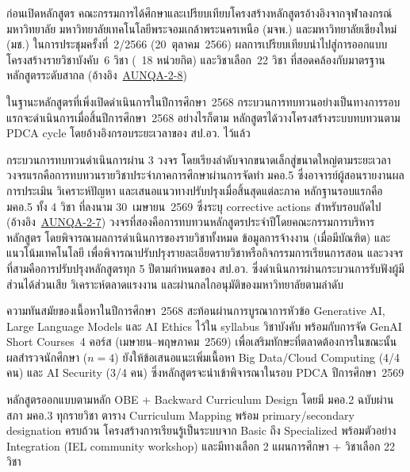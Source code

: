 

ก่อนเปิดหลักสูตร คณะกรรมการได้ศึกษาและเปรียบเทียบโครงสร้างหลักสูตรอ้างอิงจากจุฬาลงกรณ์มหาวิทยาลัย มหาวิทยาลัยเทคโนโลยีพระจอมเกล้าพระนครเหนือ (มจพ.) และมหาวิทยาลัยเชียงใหม่ (มช.) ในการประชุมครั้งที่~2/2566 (20~ตุลาคม~2566) ผลการเปรียบเทียบนำไปสู่การออกแบบโครงสร้างรายวิชาบังคับ~6 วิชา (~18 หน่วยกิต) และวิชาเลือก~22 วิชา ที่สอดคล้องกับมาตรฐานหลักสูตรระดับสากล (อ้างอิง~\hyperlink{ref:AUNQA-2-8}{AUNQA-2-8})

ในฐานะหลักสูตรที่เพิ่งเปิดดำเนินการในปีการศึกษา~2568 กระบวนการทบทวนอย่างเป็นทางการรอบแรกจะดำเนินการเมื่อสิ้นปีการศึกษา~2568 อย่างไรก็ตาม หลักสูตรได้วางโครงสร้างระบบทบทวนตาม PDCA cycle โดยอ้างอิงกรอบระยะเวลาของ สป.อว. ไว้แล้ว

กระบวนการทบทวนดำเนินการผ่าน 3 วงจร โดยเรียงลำดับจากขนาดเล็กสู่ขนาดใหญ่ตามระยะเวลา วงจรแรกคือการทบทวนรายวิชาประจำภาคการศึกษาผ่านการจัดทำ มคอ.5 ซึ่งอาจารย์ผู้สอนรายงานผลการประเมิน วิเคราะห์ปัญหา และเสนอแนวทางปรับปรุงเมื่อสิ้นสุดแต่ละภาค หลักฐานรอบแรกคือ มคอ.5 ทั้ง 4 วิชา ที่ลงนาม 30~เมษายน~2569 ซึ่งระบุ corrective actions สำหรับรอบถัดไป (อ้างอิง~\hyperlink{ref:AUNQA-2-7}{AUNQA-2-7}) วงจรที่สองคือการทบทวนหลักสูตรประจำปีโดยคณะกรรมการบริหารหลักสูตร โดยพิจารณาผลการดำเนินการของรายวิชาทั้งหมด ข้อมูลการจ้างงาน (เมื่อมีบัณฑิต) และแนวโน้มเทคโนโลยี เพื่อพิจารณาปรับปรุงรายละเอียดรายวิชาหรือกิจกรรมการเรียนการสอน และวงจรที่สามคือการปรับปรุงหลักสูตรทุก 5 ปีตามกำหนดของ สป.อว. ซึ่งดำเนินการผ่านกระบวนการรับฟังผู้มีส่วนได้ส่วนเสีย วิเคราะห์ตลาดแรงงาน และผ่านกลไกอนุมัติของมหาวิทยาลัยตามลำดับ

ความทันสมัยของเนื้อหาในปีการศึกษา~2568 สะท้อนผ่านการบูรณาการหัวข้อ Generative AI, Large Language Models และ AI Ethics ไว้ใน syllabus วิชาบังคับ พร้อมกับการจัด GenAI Short Courses~4 คอร์ส (เมษายน--พฤษภาคม~2569) เพื่อเสริมทักษะที่ตลาดต้องการในขณะนั้น ผลสำรวจนักศึกษา ($n=4$) ยังให้ข้อเสนอแนะเพิ่มเนื้อหา Big Data/Cloud Computing (4/4 คน) และ AI Security (3/4 คน) ซึ่งหลักสูตรจะนำเข้าพิจารณาในรอบ PDCA ปีการศึกษา~2569

\begin{strengthbox}
หลักสูตรออกแบบตามหลัก OBE + Backward Curriculum Design โดยมี มคอ.2 ฉบับผ่านสภา มคอ.3 ทุกรายวิชา ตาราง Curriculum Mapping พร้อม primary/secondary designation ครบถ้วน โครงสร้างการเรียนรู้เป็นระบบจาก Basic ถึง Specialized พร้อมตัวอย่าง Integration (IEL community workshop) และมีทางเลือก 2 แผนการศึกษา + วิชาเลือก 22 วิชา
\end{strengthbox}

